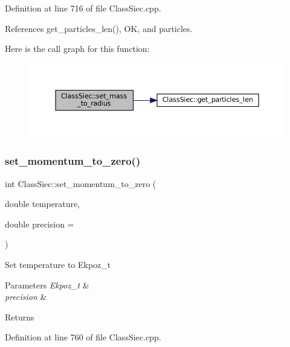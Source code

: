 Definition at line 716 of file Class\+Siec.\+cpp.



References get\+\_\+particles\+\_\+len(), OK, and particles.

Here is the call graph for this function\+:
\nopagebreak
\begin{figure}[H]
\begin{center}
\leavevmode
\includegraphics[width=350pt]{classClassSiec_a361b139e9734e15599847d2060d85d6b_cgraph}
\end{center}
\end{figure}
\mbox{\label{classClassSiec_ab2a445e522e2d8c59177fd28c074c1c1}} 
\subsubsection{\texorpdfstring{set\+\_\+momentum\+\_\+to\+\_\+zero()}{set\_momentum\_to\_zero()}}
{\footnotesize\ttfamily int Class\+Siec\+::set\+\_\+momentum\+\_\+to\+\_\+zero (\begin{DoxyParamCaption}\item[{double}]{temperature,  }\item[{double}]{precision = {} }\end{DoxyParamCaption})}

Set temperature to Ekpoz\+\_\+t 
\begin{DoxyParams}{Parameters}
{\em Ekpoz\+\_\+t} & \\
\hline
{\em precision} & \\
\hline
\end{DoxyParams}
\begin{DoxyReturn}{Returns}

\end{DoxyReturn}


Definition at line 760 of file Class\+Siec.\+cpp.



